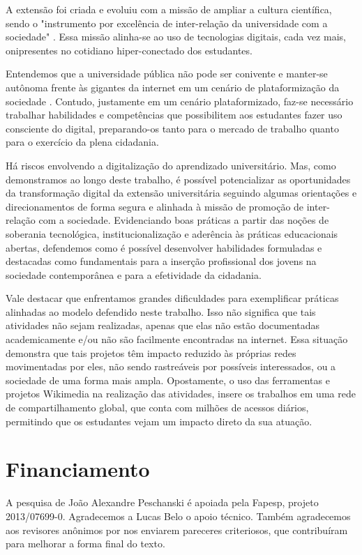 \documentclass[portuguese]{textolivre}
\begin{document}
A extensão foi criada e evoluiu com a missão de ampliar a cultura
científica, sendo o "instrumento por excelência de inter-relação da
universidade com a sociedade" \cite{FORPROEX2012a}. Essa missão
alinha-se ao uso de tecnologias digitais, cada vez mais, onipresentes no
cotidiano hiper-conectado dos estudantes.

Entendemos que a universidade pública não pode ser conivente e manter-se
autônoma frente às gigantes da internet em um cenário de plataformização
da sociedade \cite{Dijck2018}. Contudo, justamente em um cenário
plataformizado, faz-se necessário trabalhar habilidades e competências
que possibilitem aos estudantes fazer uso consciente do digital,
preparando-os tanto para o mercado de trabalho quanto para o exercício
da plena cidadania.

Há riscos envolvendo a digitalização do aprendizado universitário. Mas,
como demonstramos ao longo deste trabalho, é possível potencializar as
oportunidades da transformação digital da extensão universitária
seguindo algumas orientações e direcionamentos de forma segura e
alinhada à missão de promoção de inter-relação com a sociedade.
Evidenciando boas práticas a partir das noções de soberania tecnológica,
institucionalização e aderência às práticas educacionais abertas,
defendemos como é possível desenvolver habilidades formuladas e
destacadas como fundamentais para a inserção profissional dos jovens na
sociedade contemporânea e para a efetividade da cidadania.

Vale destacar que enfrentamos grandes dificuldades para exemplificar
práticas alinhadas ao modelo defendido neste trabalho. Isso não
significa que tais atividades não sejam realizadas, apenas que elas não
estão documentadas academicamente e/ou não são facilmente encontradas na
internet. Essa situação demonstra que tais projetos têm impacto reduzido
às próprias redes movimentadas por eles, não sendo rastreáveis por
possíveis interessados, ou a sociedade de uma forma mais ampla.
Opostamente, o uso das ferramentas e projetos Wikimedia na realização
das atividades, insere os trabalhos em uma rede de compartilhamento
global, que conta com milhões de acessos diários, permitindo que os
estudantes vejam um impacto direto da sua atuação.


\section*{Financiamento}
A pesquisa de João Alexandre Peschanski é apoiada pela Fapesp, projeto
2013/07699-0. Agradecemos a Lucas Belo o apoio técnico. Também
agradecemos aos revisores anônimos por nos enviarem pareceres
criteriosos, que contribuíram para melhorar a forma final do texto.
\end{document}
